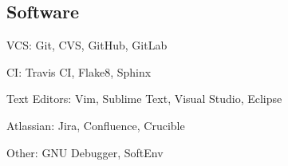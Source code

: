 
\subsection{Software}

VCS: Git, CVS, GitHub, GitLab

CI: Travis CI, Flake8, Sphinx

Text Editors: Vim, Sublime Text, Visual Studio, Eclipse

Atlassian: Jira, Confluence, Crucible

Other: GNU Debugger, SoftEnv
